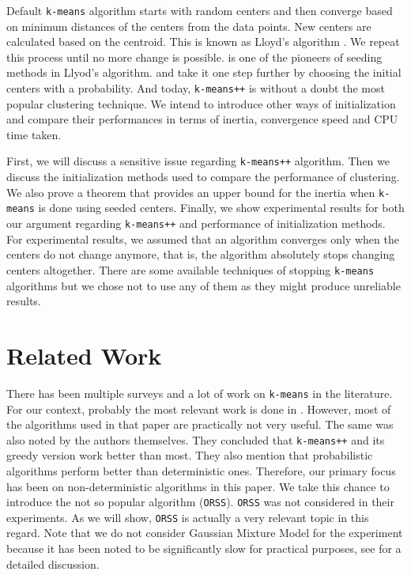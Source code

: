 \documentclass[12pt]{article}
\begin{document}
	Default \texttt{k-means} algorithm starts with random centers and then converge based on minimum distances of the centers from the data points. New centers are calculated based on the centroid. This is known as Lloyd's algorithm \textcite{lloyd_1982}. We repeat this process until no more change is possible. \textcite{forgy_1965} is one of the pioneers of seeding methods in Llyod's algorithm. \textcite{ostrovsky_rabani_schulman_swamy_2012} and \textcite{arthur_vassilvitskii_2007} take it one step further by choosing the initial centers with a probability. And today, \texttt{k-means++} is without a doubt the most popular clustering technique. We intend to introduce other ways of initialization and compare their performances in terms of inertia, convergence speed and CPU time taken.

	First, we will discuss a sensitive issue regarding \texttt{k-means++} algorithm. Then we discuss the initialization methods used to compare the performance of clustering. We also prove a theorem that provides an upper bound for the inertia when \texttt{k-means} is done using seeded centers. Finally, we show experimental results for both our argument regarding \texttt{k-means++} and performance of initialization methods. For experimental results, we assumed that an algorithm converges only when the centers do not change anymore, that is, the algorithm absolutely stops changing centers altogether. There are some available techniques of stopping \texttt{k-means} algorithms but we chose not to use any of them as they might produce unreliable results.
	\section{Related Work}
	There has been multiple surveys and a lot of work on \texttt{k-means} in the literature. For our context, probably the most relevant work is done in \textcite{celebi_kingravi_vela_2013}. However, most of the algorithms used in that paper are practically not very useful. The same was also noted by the authors themselves. They concluded that \texttt{k-means++} and its greedy version work better than most. They also mention that probabilistic algorithms perform better than deterministic ones. Therefore, our primary focus has been on non-deterministic algorithms in this paper. We take this chance to introduce the not so popular algorithm \textcite{ostrovsky_rabani_schulman_swamy_2012} (\texttt{ORSS}). \texttt{ORSS} was not considered in their experiments. As we will show, \texttt{ORSS} is actually a very relevant topic in this regard. Note that we do not  consider Gaussian Mixture Model for the experiment because it has been noted to be significantly slow for practical purposes, see \textcite{Patel_Kushwaha_2020} for a detailed discussion.
\end{document}

